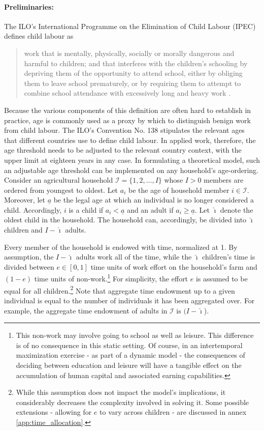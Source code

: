\documentclass[a4paper,12pt]{article}
\theoremstyle{plain}
\theoremstyle{definition}
\theoremstyle{definition}
\theoremstyle{definition}
\theoremstyle{definition}
\begin{document}
\paragraph{Preliminaries:}
\label{sec:Preliminaries}
The ILO's International Programme on the Elimination of Child Labour (IPEC) defines child labour as

\begin{quote}
work that is mentally, physically, socially or morally dangerous and harmful to children; and that interferes with the children’s schooling by depriving them of the opportunity to attend school, either by obliging them to leave school prematurely, or by requiring them to attempt to combine school attendance with excessively long and heavy work \citep{ilo2021}.
\end{quote}
Because the various components of this definition are often hard to establish in practice, age is commonly used as a proxy by which to distinguish benign work from child labour. The ILO’s Convention No. 138 stipulates the relevant ages that different countries use to define child labour. In applied work, therefore, the age threshold needs to be adjusted to the relevant country context, with the upper limit at eighteen years in any case. In formulating a theoretical model, such an adjustable age threshold can be implemented on any household's age-ordering. Consider an agricultural household $\mathcal{I}=\{1,2,...,I\}$ whose $I>0$ members are ordered from youngest to oldest. Let $a_i$ be the age of household member $i\in\mathcal{I}$. Moreover, let $\underline{a}$ be the legal age at which an individual is no longer considered a child. Accordingly, $i$ is a child if $a_i<\underline{a}$ and an adult if $a_i\geq \underline{a}$. Let $\hat{\imath}$ denote the oldest child in the household. The household can, accordingly, be divided into $\hat{\imath}$ children and $I-\hat{\imath}$ adults.

Every member of the household is endowed with time, normalized at 1. By assumption, the $I-\hat{\imath}$ adults work all of the time, while the $\hat{\imath}$ children's time is divided between $e\in[0,1]$ time units of work effort on the household's farm and $(1-e)$ time units of non-work.\footnote{This non-work may involve going to school as well as leisure. This difference is of no consequence in this static setting. Of course, in an intertemporal maximization exercise - as part of a dynamic model - the consequences of deciding between education and leisure will have a tangible effect on the accumulation of human capital and associated earning capabilities.} For simplicity, the effort $e$ is assumed to be equal for all children.\footnote{While this assumption does not impact the model's implications, it considerably decreases the complexity involved in solving it. Some possible extensions - allowing for $e$ to vary across children - are discussed in annex \ref{app:time_allocation}.} Note that aggregate time endowment up to a given individual is equal to the number of individuals it has been aggregated over. For example, the aggregate time endowment of adults in $\mathcal{I}$ is $(I-\hat{\imath}$). 
\end{document}
